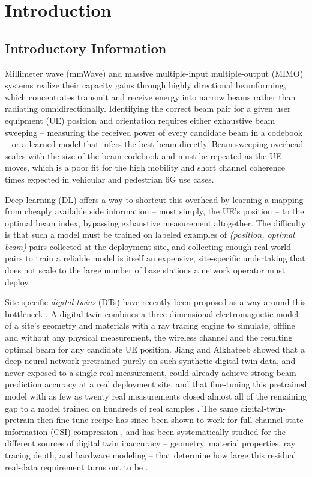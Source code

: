 \documentclass{iutbscthesis}
\begin{document}

\chapter{Introduction}

\section{Introductory Information}

Millimeter wave (mmWave) and massive multiple-input multiple-output (MIMO) systems realize their capacity gains through highly directional beamforming, which concentrates transmit and receive energy into narrow beams rather than radiating omnidirectionally. Identifying the correct beam pair for a given user equipment (UE) position and orientation requires either exhaustive beam sweeping -- measuring the received power of every candidate beam in a codebook -- or a learned model that infers the best beam directly. Beam sweeping overhead scales with the size of the beam codebook and must be repeated as the UE moves, which is a poor fit for the high mobility and short channel coherence times expected in vehicular and pedestrian 6G use cases.

Deep learning (DL) offers a way to shortcut this overhead by learning a mapping from cheaply available side information -- most simply, the UE's position -- to the optimal beam index, bypassing exhaustive measurement altogether. The difficulty is that such a model must be trained on labeled examples of \emph{(position, optimal beam)} pairs collected at the deployment site, and collecting enough real-world pairs to train a reliable model is itself an expensive, site-specific undertaking that does not scale to the large number of base stations a network operator must deploy.

Site-specific \emph{digital twins} (DTs) have recently been proposed as a way around this bottleneck \cite{alkhateeb2023realtime}. A digital twin combines a three-dimensional electromagnetic model of a site's geometry and materials with a ray tracing engine to simulate, offline and without any physical measurement, the wireless channel and the resulting optimal beam for any candidate UE position. Jiang and Alkhateeb showed that a deep neural network pretrained purely on such synthetic digital twin data, and never exposed to a single real measurement, could already achieve strong beam prediction accuracy at a real deployment site, and that fine-tuning this pretrained model with as few as twenty real measurements closed almost all of the remaining gap to a model trained on hundreds of real samples \cite{jiang2023digitaltwinbeam}. The same digital-twin-pretrain-then-fine-tune recipe has since been shown to work for full channel state information (CSI) compression \cite{jiang2024digitaltwincsi}, and has been systematically studied for the different sources of digital twin inaccuracy -- geometry, material properties, ray tracing depth, and hardware modeling -- that determine how large this residual real-data requirement turns out to be \cite{luo2025fidelity}.
\end{document}
